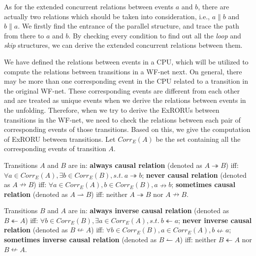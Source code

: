 \documentclass[dvips,...]{llncs}
\begin{document}
As for the extended concurrent relations between events $a$ and $b$, there are actually two relations which should be taken into consideration, i.e., $a\parallel b$ and $b\parallel a$. We firstly find the entrance of the parallel structure, and trace the path from there to $a$ and $b$. By checking every condition to find out all the \textit{loop} and \textit{skip} structures, we can derive the extended concurrent relations between them.

We have defined the relations between events in a CPU, which will be utilized to compute the relations between transitions in a WF-net next. On general, there may be more than one corresponding event in the CPU related to a transition in the original WF-net. These corresponding events are different from each other and are treated as unique events when we derive the relations between events in the unfolding. Therefore, when we try to derive the ExRORUs between transitions in the WF-net, we need to check the relations between each pair of corresponding events of those transitions. Based on this, we give the computation of ExRORU between transitions. Let $Corr_{E}(A)$ be the set containing all the corresponding events of transition $A$.

\begin{definition}\label{def:causalRelations}
Transitions $A$ and $B$ are in: \textbf{always causal relation} (denoted as $A\twoheadrightarrow B$) iff: $\forall a\in Corr_{E}(A), \exists b\in Corr_{E}(B), s.t.~a\twoheadrightarrow b$; \textbf{never causal relation} (denoted as $A\nrightarrow B$) iff: $\forall a\in Corr_{E}(A), b\in Corr_{E}(B), a\nrightarrow b$; \textbf{sometimes causal relation} (denoted as $A\rightharpoonup B$) iff: neither $A\twoheadrightarrow B$ nor $A\nrightarrow B$.
\end{definition}

\begin{definition}\label{def:inverseCausalRelations}
Transitions $B$ and $A$ are in: \textbf{always inverse causal relation} (denoted as $B\twoheadleftarrow A$) iff: $\forall b\in Corr_{E}(B), \exists a\in Corr_{E}(A), s.t.~b\twoheadleftarrow a$; \textbf{never inverse causal relation} (denoted as $B\nleftarrow A$) iff: $\forall b\in Corr_{E}(B), a\in Corr_{E}(A), b\nleftarrow a$; \textbf{sometimes inverse causal relation} (denoted as $B\leftharpoonup A$) iff: neither $B\twoheadleftarrow A$ nor $B\nleftarrow A$.
\end{definition}
\end{document}

